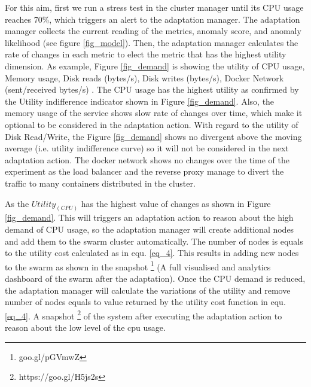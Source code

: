 \documentclass[sigconf]{acmart}
\begin{document}
For this aim, first we run a stress test in the cluster manager until its CPU usage reaches 70\%, which triggers an alert to the adaptation manager. The adaptation manager collects the current reading of the metrics, anomaly score, and anomaly likelihood (see figure \ref{fig_model}). Then, the adaptation manager calculates the rate of changes in each metric to elect the metric that has the highest utility dimension. As example, Figure \ref{fig_demand} is showing the utility of CPU usage, Memory usage, Disk reads (bytes/s), Disk writes (bytes/s), Docker Network (sent/received bytes/s) . The CPU usage has the highest utility as confirmed by the Utility indifference indicator shown in Figure \ref{fig_demand}. Also, the memory usage of the service shows slow rate of changes over time, which make it optional to be considered in the adaptation action. With regard to the utility of Disk Read/Write, the Figure \ref{fig_demand} shows no divergent above the moving average (i.e. utility indifference curve) so it will not be considered in the next adaptation action. The docker network shows no changes over the time of the experiment as the load balancer and the reverse proxy manage to divert the traffic to many containers distributed in the cluster.

As the $Utility_(CPU)$ has the highest value of changes as shown in Figure \ref{fig_demand}. This will triggers an adaptation action to reason about the high demand of CPU usage, so the adaptation manager will create additional nodes and add them to the swarm cluster automatically. The number of nodes is equals to the utility cost calculated as in equ. \ref{eq_4}. This results in adding new nodes to the swarm as shown in the snapshot \footnote{goo.gl/pGVmwZ} (A full visualised and analytics dashboard of the swarm after the adaptation).
Once the CPU demand is reduced, the adaptation manager will calculate the variations of the utility and remove number of nodes equals to value returned by the utility cost function in equ. \ref{eq_4}. A snapshot \footnote{https://goo.gl/H5js2s} of the system after executing the adaptation action to reason about the low level of the cpu usage. 
\end{document}
